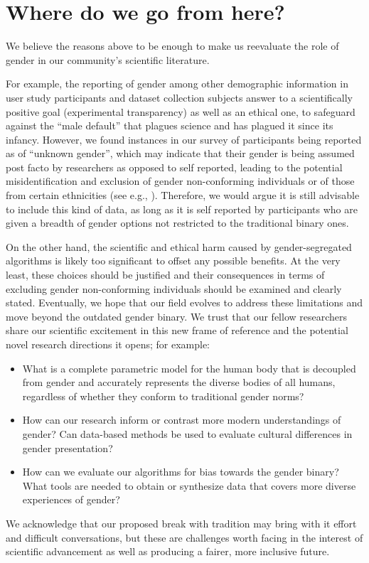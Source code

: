 \documentclass[sigconf,review,balance=false]{acmart}
\begin{document}
\section{Where do we go from here?}

We believe the reasons above to be enough to make us reevaluate the role of
gender in our community's scientific literature.

For example, the reporting of gender among other demographic information in user
study participants and dataset collection subjects answer to a scientifically
positive goal (experimental transparency) as well as an ethical one, to
safeguard against the “male default” that plagues science and has plagued it
since its infancy. However, we found instances in our survey of participants
being reported as of “unknown gender”, which may indicate that their gender is
being assumed post facto by researchers as opposed to self reported, leading to
the potential misidentification and exclusion of gender non-conforming
individuals or of those from certain ethnicities (see e.g.,
\cite{santamaria2018comparison,buolamwini2018gender}). Therefore, we would argue
it is still advisable to include this kind of data, as long as it is self
reported by participants who are given a breadth of gender options not
restricted to the traditional binary ones.

On the other hand, the scientific and ethical harm caused by gender-segregated
algorithms is likely too significant to offset any possible benefits. At the
very least, these choices should be justified and their consequences in terms of
excluding gender non-conforming individuals should be examined and clearly
stated. Eventually, we hope that our field evolves to address these limitations
and move beyond the outdated gender binary. We trust that our fellow researchers
share our scientific excitement in this new frame of reference and the potential
novel research directions it opens; for example:
\begin{itemize}
    \item What is a complete parametric model for the human body that is
    decoupled from gender and accurately represents the diverse bodies of all
    humans, regardless of whether they conform to traditional gender norms?
    \item How can our research inform or contrast more modern understandings of
    gender? Can data-based methods be used to evaluate cultural differences in
    gender presentation?
    \item How can we evaluate our algorithms for bias towards the gender binary?
    What tools are needed to obtain or synthesize data that covers more diverse
    experiences of gender?
\end{itemize}

We acknowledge that our proposed break with tradition may bring with it effort
and difficult conversations, but these are challenges worth facing in the
interest of scientific advancement as well as producing a fairer, more inclusive
future.



\end{document}
